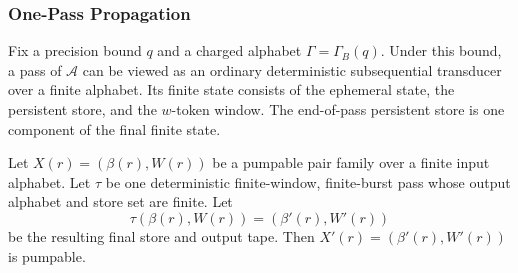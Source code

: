 \subsubsection{One-Pass Propagation}

Fix a precision bound $q$ and a charged alphabet $\Gamma=\Gamma_B(q)$. Under
this bound, a pass of $\mathcal{A}$ can be viewed as an ordinary deterministic
subsequential transducer over a finite alphabet. Its finite state consists of
the ephemeral state, the persistent store, and the $w$-token window. The
end-of-pass persistent store is one component of the final finite state.

\begin{lemma}
\label{app:lem:one-pass-pump}
Let $X(r)=(\beta(r),W(r))$ be a pumpable pair family over a finite input
alphabet. Let $\tau$ be one deterministic finite-window, finite-burst pass whose
output alphabet and store set are finite. Let
\[
  \tau(\beta(r),W(r))=(\beta'(r),W'(r))
\]
be the resulting final store and output tape. Then
$X'(r)=(\beta'(r),W'(r))$ is pumpable.
\end{lemma}

